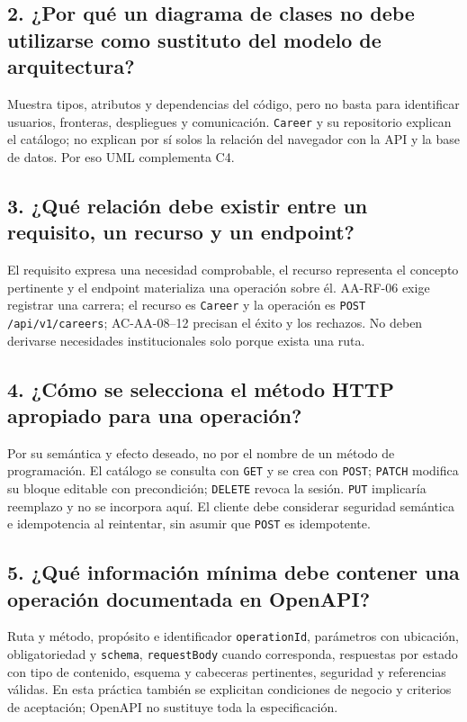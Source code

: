 \documentclass[11pt,a4paper]{article}
\begin{document}
\subsection*{2. ¿Por qué un diagrama de clases no debe utilizarse como sustituto del modelo de arquitectura?}

Muestra tipos, atributos y dependencias del código, pero no basta para identificar usuarios, fronteras, despliegues y comunicación. \texttt{Career} y su repositorio explican el catálogo; no explican por sí solos la relación del navegador con la API y la base de datos. Por eso UML complementa C4.

\subsection*{3. ¿Qué relación debe existir entre un requisito, un recurso y un endpoint?}

El requisito expresa una necesidad comprobable, el recurso representa el concepto pertinente y el endpoint materializa una operación sobre él. AA-RF-06 exige registrar una carrera; el recurso es \texttt{Career} y la operación es \texttt{POST /api/v1/careers}; AC-AA-08--12 precisan el éxito y los rechazos. No deben derivarse necesidades institucionales solo porque exista una ruta.

\subsection*{4. ¿Cómo se selecciona el método HTTP apropiado para una operación?}

Por su semántica y efecto deseado, no por el nombre de un método de programación. El catálogo se consulta con \texttt{GET} y se crea con \texttt{POST}; \texttt{PATCH} modifica su bloque editable con precondición; \texttt{DELETE} revoca la sesión. \texttt{PUT} implicaría reemplazo y no se incorpora aquí. El cliente debe considerar seguridad semántica e idempotencia al reintentar, sin asumir que \texttt{POST} es idempotente.

\subsection*{5. ¿Qué información mínima debe contener una operación documentada en OpenAPI?}

Ruta y método, propósito e identificador \texttt{operationId}, parámetros con ubicación, obligatoriedad y \texttt{schema}, \texttt{requestBody} cuando corresponda, respuestas por estado con tipo de contenido, esquema y cabeceras pertinentes, seguridad y referencias válidas. En esta práctica también se explicitan condiciones de negocio y criterios de aceptación; OpenAPI no sustituye toda la especificación.
\end{document}
